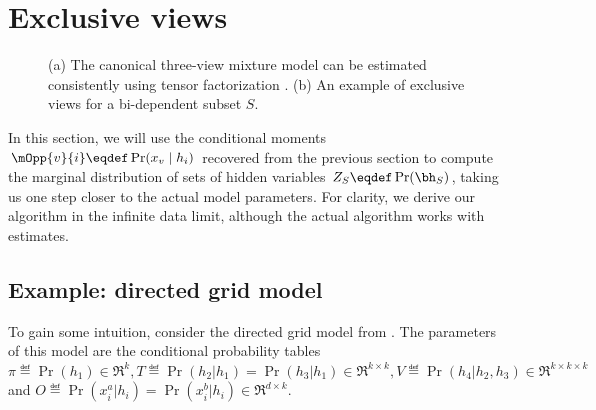 \section{Exclusive views}
\label{sec:directed}

\begin{figure}
  \centering

  \caption{(a) The canonical three-view mixture model can be estimated consistently
  using tensor factorization \citep{anandkumar13tensor}.
  (b) An example of exclusive views for a bi-dependent subset $S$.
  }
\end{figure}


In this section, we will use the conditional moments $\mOpp{v}{i} \eqdef
\Pr(x_v \mid h_i)$ recovered from the previous section
to compute the marginal distribution of sets of hidden variables $Z_S \eqdef \Pr(\bh_S)$,
taking us one step closer to the actual model parameters.
For clarity, we derive our algorithm in the infinite data limit,
although the actual algorithm works with estimates.

\subsection{Example: directed grid model}
\label{sec:directedExample}

To gain some intuition, consider the directed grid model from .
The parameters of this model are the conditional probability tables
$\pi \eqdef \Pr(h_1) \in \Re^k, T \eqdef \Pr(h_2 | h_1) = \Pr(h_3 | h_1) \in \Re^{k \times k},
V \eqdef \Pr(h_4 | h_2, h_3) \in \Re^{k \times k \times k}$ and $O \eqdef \Pr(x^a_i | h_i)
=  \Pr(x^b_i | h_i) \in \Re^{d \times k}$. 

